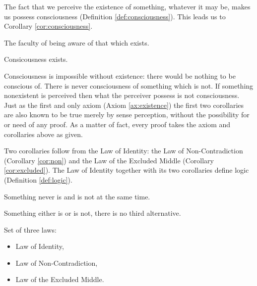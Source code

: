         The fact that we perceive the existence of something, whatever it may be, makes us possess consciousness (Definition \ref{def:consciousness}). This leads us to Corollary \ref{cor:consciousness}.
        
            \begin{definition}[Consciousness]
            \label{def:consciousness}
                The faculty of being aware of that which exists.
            \end{definition}
            
            \begin{corollary}[Consciousness]
            \label{cor:consciousness}
                Consicousness exists.
            \end{corollary}
            
        Consciousness is impossible without existence: there would be nothing to be conscious of. There is never consciousness of something which is not. If something nonexistent is perceived then what the perceiver possess is not consciousness. Just as the first and only axiom (Axiom \ref{ax:existence}) the first two corollaries are also known to be true merely by sense perception, without the possibility for or need of any proof. As a matter of fact, every proof takes the axiom and corollaries above as given.
        
        Two corollaries follow from the Law of Identity: the Law of Non-Contradiction (Corollary \ref{cor:non}) and the Law of the Excluded Middle (Corollary \ref{cor:excluded}). The Law of Identity together with its two corollaries define logic (Definition \ref{def:logic}).
            
            \begin{corollary}
            \label{cor:non}
                Something never is and is not at the same time.
            \end{corollary}
            
            \begin{corollary}
            \label{cor:excluded}
                Something either is or is not, there is no third alternative.
            \end{corollary}

            \begin{definition}[Logic]
            \label{def:logic}
                Set of three laws:
                \begin{itemize}
                    \item Law of Identity,
                    \item Law of Non-Contradiction,
                    \item Law of the Excluded Middle.
                \end{itemize}
            \end{definition}
            
